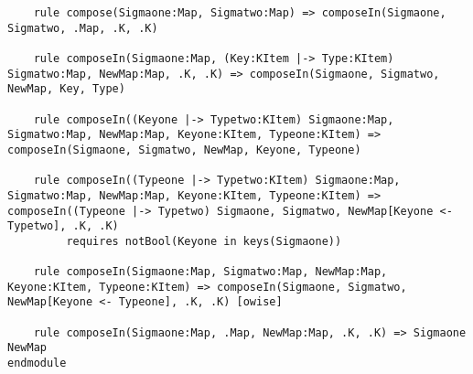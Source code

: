 \begin{lstlisting}
    rule compose(Sigmaone:Map, Sigmatwo:Map) => composeIn(Sigmaone, Sigmatwo, .Map, .K, .K)

    rule composeIn(Sigmaone:Map, (Key:KItem |-> Type:KItem) Sigmatwo:Map, NewMap:Map, .K, .K) => composeIn(Sigmaone, Sigmatwo, NewMap, Key, Type)

    rule composeIn((Keyone |-> Typetwo:KItem) Sigmaone:Map, Sigmatwo:Map, NewMap:Map, Keyone:KItem, Typeone:KItem) => composeIn(Sigmaone, Sigmatwo, NewMap, Keyone, Typeone)

    rule composeIn((Typeone |-> Typetwo:KItem) Sigmaone:Map, Sigmatwo:Map, NewMap:Map, Keyone:KItem, Typeone:KItem) => composeIn((Typeone |-> Typetwo) Sigmaone, Sigmatwo, NewMap[Keyone <- Typetwo], .K, .K)
         requires notBool(Keyone in keys(Sigmaone))

    rule composeIn(Sigmaone:Map, Sigmatwo:Map, NewMap:Map, Keyone:KItem, Typeone:KItem) => composeIn(Sigmaone, Sigmatwo, NewMap[Keyone <- Typeone], .K, .K) [owise]

    rule composeIn(Sigmaone:Map, .Map, NewMap:Map, .K, .K) => Sigmaone NewMap
endmodule
\end{lstlisting}